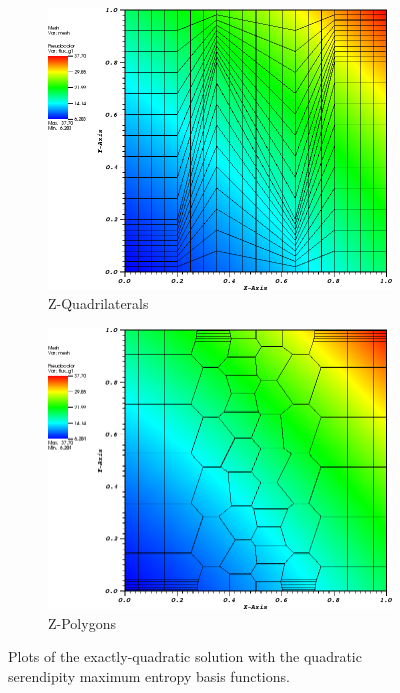 \begin{figure}
{\begin{subfigure}[b]{0.465\textwidth}
	\end{subfigure}
}
{
	\vspace{3mm}
	\begin{subfigure}[b]{0.465\textwidth}
		\centering
		\label{subfig::z_quad_me_k2_lin_sol}
		\includegraphics[width=\textwidth]{figures/sec_BF/quad_sol_zquad.png}
		\caption{Z-Quadrilaterals}
	\end{subfigure}
	\hfill
	\begin{subfigure}[b]{0.465\textwidth}
		\centering
		\label{subfig::z_poly_me_k2_lin_sol}
		\includegraphics[width=\textwidth]{figures/sec_BF/quad_sol_zpoly.png}
		\caption{Z-Polygons}
	\end{subfigure}
}
\caption{Plots of the exactly-quadratic solution with the quadratic serendipity maximum entropy basis functions.}
\label{fig::BF_Results_quad_sol}
\end{figure}

